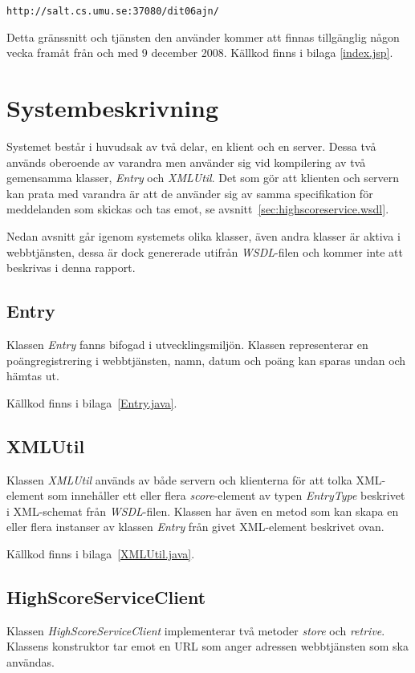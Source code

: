 \documentclass[a4paper, 12pt]{article}
\begin{document}
\begin{footnotesize}
\verb!http://salt.cs.umu.se:37080/dit06ajn/!
\end{footnotesize}

Detta gränssnitt och tjänsten den använder kommer att finnas
tillgänglig någon vecka framåt från och med 9 december 2008. Källkod
finns i bilaga \ref{index.jsp}.

\section{Systembeskrivning}\label{Systembeskrivning}

Systemet består i huvudsak av två delar, en klient och en
server. Dessa två används oberoende av varandra men använder sig vid
kompilering av två gemensamma klasser, \textit{Entry} och
\textit{XMLUtil}. Det som gör att klienten och servern kan prata med
varandra är att de använder sig av samma specifikation för meddelanden
som skickas och tas emot, se avsnitt~\ref{sec:highscoreservice.wsdl}.

Nedan avsnitt går igenom systemets olika klasser, även andra klasser
är aktiva i webbtjänsten, dessa är dock genererade utifrån
\textit{WSDL}-filen och kommer inte att beskrivas i denna rapport.

\subsection{Entry}
Klassen \textit{Entry} fanns bifogad i utvecklingsmiljön. Klassen
representerar en poängregistrering i webbtjänsten, namn, datum och
poäng kan sparas undan och hämtas ut.

Källkod finns i bilaga~\ref{Entry.java}.

\subsection{XMLUtil}
Klassen \textit{XMLUtil} används av både servern och klienterna för
att tolka XML-element som innehåller ett eller flera
\textit{score}-element av typen \textit{EntryType} beskrivet i
XML-schemat från \textit{WSDL}-filen. Klassen har även en metod som
kan skapa en eller flera instanser av klassen \textit{Entry} från
givet XML-element beskrivet ovan.

Källkod finns i bilaga~\ref{XMLUtil.java}.

\subsection{HighScoreServiceClient}
Klassen \textit{HighScoreServiceClient} implementerar två metoder
\textit{store} och \textit{retrive}. Klassens konstruktor tar emot en
URL som anger adressen webbtjänsten som ska användas.
\end{document}
